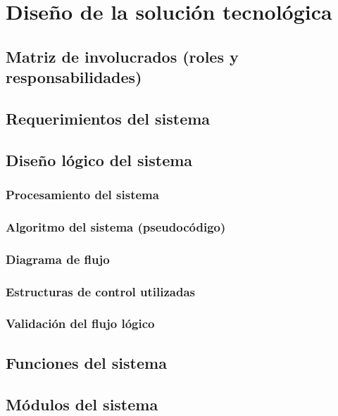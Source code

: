\section{Diseño de la solución tecnológica}

\subsection{Matriz de involucrados (roles y responsabilidades)}

\subsection{Requerimientos del sistema}

\subsection{Diseño lógico del sistema}

\subsubsection{Procesamiento del sistema}

\subsubsection{Algoritmo del sistema (pseudocódigo)}

\subsubsection{Diagrama de flujo}

\subsubsection{Estructuras de control utilizadas}

\subsubsection{Validación del flujo lógico}

\subsection{Funciones del sistema}

\subsection{Módulos del sistema}
